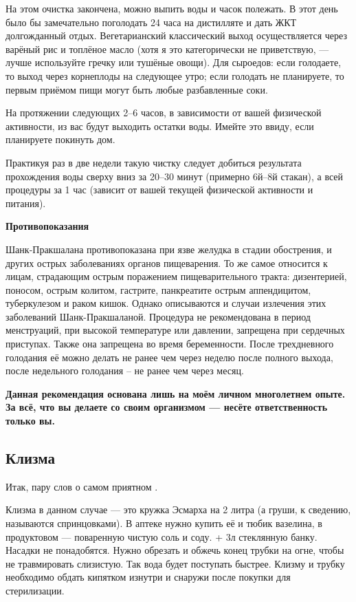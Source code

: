 На этом очистка закончена, можно выпить воды и часок полежать. В этот день было бы замечательно поголодать 24 часа на дистилляте и дать ЖКТ долгожданный отдых.
Вегетарианский классический выход осуществляется через варёный рис и топлёное масло (хотя я это категорически не приветствую, — лучше используйте гречку или тушёные овощи). Для сыроедов: если голодаете, то выход через корнеплоды на следующее утро; если голодать не планируете, то первым приёмом пищи могут быть любые разбавленные соки.

На протяжении следующих 2–6 часов, в зависимости от вашей физической активности, из вас будут выходить остатки воды. Имейте это ввиду, если планируете покинуть дом.

Практикуя раз в две недели такую чистку следует добиться результата прохождения воды сверху вниз за 20–30 минут (примерно 6й–8й стакан), а всей процедуры за 1 час (зависит от вашей текущей физической активности и питания).

\textbf{Противопоказания}

Шанк-Пракшалана противопоказана при язве желудка в стадии обострения, и других острых заболеваниях органов пищеварения. То же самое относится к лицам, страдающим острым поражением пищеварительного тракта: дизентерией, поносом, острым колитом, гастрите, панкреатите острым аппендицитом, туберкулезом и раком кишок. Однако описываются и случаи излечения этих заболеваний Шанк-Пракшаланой.
Процедура не рекомендована  в период менструаций, при высокой температуре или давлении,  запрещена при сердечных приступах. Также она запрещена во время беременности. После трехдневного голодания её можно делать не ранее чем через неделю после полного выхода, после недельного голодания – не ранее чем через месяц.

\textbf{Данная рекомендация основана лишь на моём личном многолетнем опыте. За всё, что вы делаете со своим организмом — несёте ответственность только вы.}


\subsection{Клизма}\label{fasting2}
Итак, пару слов о самом приятном \faSmileO.

Клизма в данном случае — это кружка Эсмарха на 2 литра (а груши, к сведению, называются спринцовками).
В аптеке нужно купить её и тюбик вазелина, в продуктовом — поваренную чистую соль и соду. + 3л стеклянную банку.
\\

Насадки не понадобятся. Нужно обрезать и обжечь конец трубки на огне, чтобы не травмировать слизистую. Так вода будет поступать быстрее. Клизму и трубку необходимо обдать кипятком изнутри и снаружи после покупки для стерилизации. 
\\

